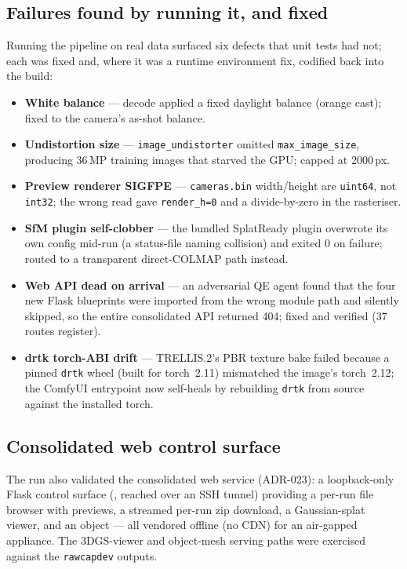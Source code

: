 \subsection{Failures found by running it, and fixed}

Running the pipeline on real data surfaced six defects that unit tests had not; each was
fixed and, where it was a runtime environment fix, codified back into the build:

\begin{itemize}
  \item \textbf{White balance} --- decode applied a fixed daylight balance (orange cast);
        fixed to the camera's as-shot balance.
  \item \textbf{Undistortion size} --- \texttt{image\_undistorter} omitted
        \texttt{max\_image\_size}, producing 36\,MP training images that starved the GPU;
        capped at 2000\,px.
  \item \textbf{Preview renderer SIGFPE} --- \texttt{cameras.bin} width/height are
        \texttt{uint64}, not \texttt{int32}; the wrong read gave \texttt{render\_h=0} and
        a divide-by-zero in the rasteriser.
  \item \textbf{SfM plugin self-clobber} --- the bundled SplatReady plugin overwrote its
        own config mid-run (a status-file naming collision) and exited 0 on failure;
        routed to a transparent direct-COLMAP path instead.
  \item \textbf{Web API dead on arrival} --- an adversarial QE agent found that the four
        new Flask blueprints were imported from the wrong module path and silently
        skipped, so the entire consolidated API returned 404; fixed and verified (37
        routes register).
  \item \textbf{drtk torch-ABI drift} --- TRELLIS.2's PBR texture bake failed because a
        pinned \texttt{drtk} wheel (built for torch~2.11) mismatched the image's
        torch~2.12; the ComfyUI entrypoint now self-heals by rebuilding \texttt{drtk}
        from source against the installed torch.
\end{itemize}

\subsection{Consolidated web control surface}

The run also validated the consolidated web service (ADR-023): a loopback-only Flask
control surface (, reached over an SSH tunnel) providing a per-run
file browser with previews, a streamed per-run zip download, a Gaussian-splat viewer, and
an object  --- all vendored offline (no CDN) for an air-gapped
appliance. The 3DGS-viewer and object-mesh serving paths were exercised against the
\texttt{rawcapdev} outputs.

